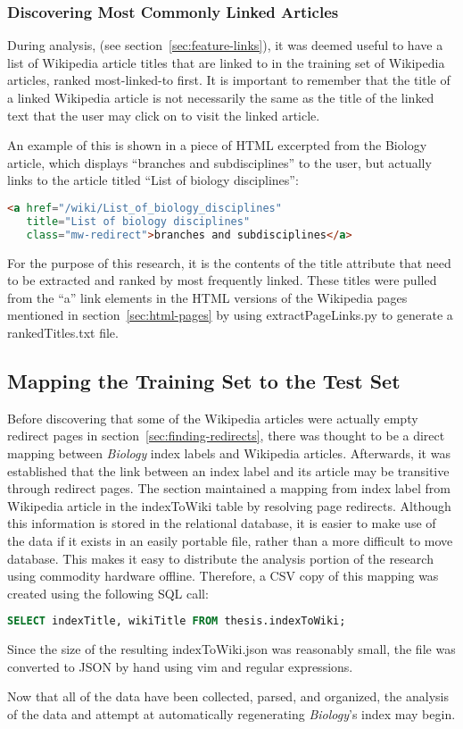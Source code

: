 \subsubsection{Discovering Most Commonly Linked Articles}

During analysis, (see section~\ref{sec:feature-links}), it was deemed useful to have a list of Wikipedia article titles that are linked to in the training set of Wikipedia articles, ranked most-linked-to first.
It is important to remember that the title of a linked Wikipedia article is not necessarily the same as the title of the linked text that the user may click on to visit the linked article.

An example of this is shown in a piece of HTML excerpted from the Biology article, which displays ``branches and subdisciplines'' to the user, but actually links to the article titled ``List of biology disciplines'':
\begin{lstlisting}[language=HTML]
<a href="/wiki/List_of_biology_disciplines"
   title="List of biology disciplines"
   class="mw-redirect">branches and subdisciplines</a>
\end{lstlisting}
\noindent For the purpose of this research, it is the contents of the title attribute that need to be extracted and ranked by most frequently linked.
These titles were pulled from the ``a'' link elements in the HTML versions of the Wikipedia pages mentioned in section~\ref{sec:html-pages} by using extractPageLinks.py to generate a rankedTitles.txt file.

\subsection{Mapping the Training Set to the Test Set}

Before discovering that some of the Wikipedia articles were actually empty redirect pages in section~\ref{sec:finding-redirects}, there was thought to be a direct mapping between {\it Biology} index labels and Wikipedia articles.
Afterwards, it was established that the link between an index label and its article may be transitive through redirect pages.
The section maintained a mapping from index label from Wikipedia article in the indexToWiki table by resolving page redirects.
Although this information is stored in the relational database, it is easier to make use of the data if it exists in an easily portable file, rather than a more difficult to move database.
This makes it easy to distribute the analysis portion of the research using commodity hardware offline.
Therefore, a CSV copy of this mapping was created using the following SQL call:
\begin{lstlisting}[language=SQL]
SELECT indexTitle, wikiTitle FROM thesis.indexToWiki;
\end{lstlisting}
\noindent Since the size of the resulting indexToWiki.json was reasonably small, the file was converted to JSON by hand using vim and regular expressions.

Now that all of the data have been collected, parsed, and organized, the analysis of the data and attempt at automatically regenerating {\it Biology}'s index may begin.
